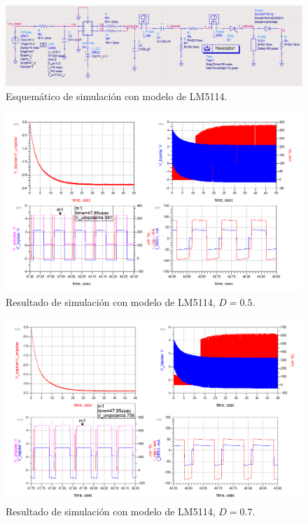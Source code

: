\begin{figure}[tbp]
    \centering
    \includegraphics[width=\textwidth]{images/lm5114_sim_sch.png}
    \caption{Esquemático de simulación con modelo de LM5114.}
    \label{fig:lm5114_sim_sch}
\end{figure}

\begin{figure}[tbp]
    \centering
    \includegraphics[width=\textwidth]{images/lm5114_sim_result_50_D.png}
    \caption{Resultado de simulación con modelo de LM5114, $D=0.5$.}
    \label{fig:lm5114_sim_result_50_D}
\end{figure}

\begin{figure}[tbp]
    \centering
    \includegraphics[width=\textwidth]{images/lm5114_sim_result_70_D.png}
    \caption{Resultado de simulación con modelo de LM5114, $D=0.7$.}
    \label{fig:lm5114_sim_result_70_D}
\end{figure}

